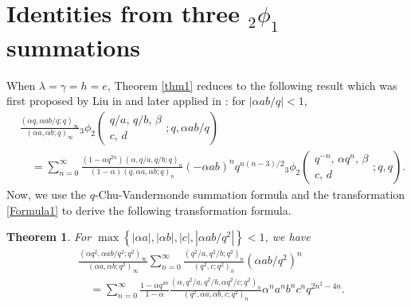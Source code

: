 \documentclass[reqno,12pt]{amsart}
\newtheorem{theorem}{Theorem}[section]%
\theoremstyle{remark}
\numberwithin{equation}{section}
\begin{document}





\section{Identities from three ${_2\phi_1}$ summations}\label{sec2}
When  $\lambda=\gamma=h=e$, Theorem \ref{thm1} reduces to  the following result which was first proposed by Liu in \cite{Liu_1} and later applied in \cite{Wang, Wang_Chen,Wang_Yee}: for $|\alpha ab/q|<1$,
\begin{align}
&\frac{\left(\alpha q,\alpha ab/q;q\right)_{\infty}}{\left(\alpha a,\alpha b;q\right)_{\infty}}
{_3\phi_2}\left(\begin{array}{ccc}
q/a,\,q/b,\,\beta\\
c,\,d
\end{array}
;q,{\alpha ab}/{q}\right)\nonumber\\
&\quad=
\sum_{n=0}^{\infty}
\frac{\left(1-\alpha q^{2n}\right)\left(\alpha,q/a,q/b;q\right)_n}
{\left(1-\alpha\right)\left(q,\alpha a,\alpha b;q\right)_n}
\left(-\alpha ab\right)^nq^{{n\left(n-3\right)}/{2}}
{_3\phi_2}\left(\begin{array}{ccc}
q^{-n},\,\alpha q^n,\,\beta\\
c,\,d
\end{array}
;q,q\right).\label{Formula1}
\end{align}
Now, we use the $q$-Chu-Vandermonde summation formula and  the transformation \eqref{Formula1} to derive the following transformation formula.
\begin{theorem}\label{thm9}
For $\max\left\{|\alpha a|,|\alpha b|,|c|,|\alpha ab/q^2|\right\}<1$, we have
\begin{align*}
&\frac{\left(\alpha q^2,\alpha ab/q^2;q^2\right)_{\infty}}
{\left(\alpha a,\alpha b;q^2\right)_{\infty}}
\sum_{n=0}^{\infty}\frac{\left(q^2/a,q^2/b;q^2\right)_n}
{\left(q^2,c;q^2\right)_n}\left(\alpha ab/q^2\right)^n\\
&\quad=\sum_{n=0}^{\infty}\frac{1-\alpha q^{4n}}{1-\alpha}
\frac{\left(\alpha,q^2/a,q^2/b,\alpha q^2/c;q^2\right)_n}
{\left(q^2,\alpha a,\alpha b,c;q^2\right)_n}\alpha^n a^nb^nc^nq^{2n^2-4n}.
\end{align*}
\end{theorem}
\end{document}
